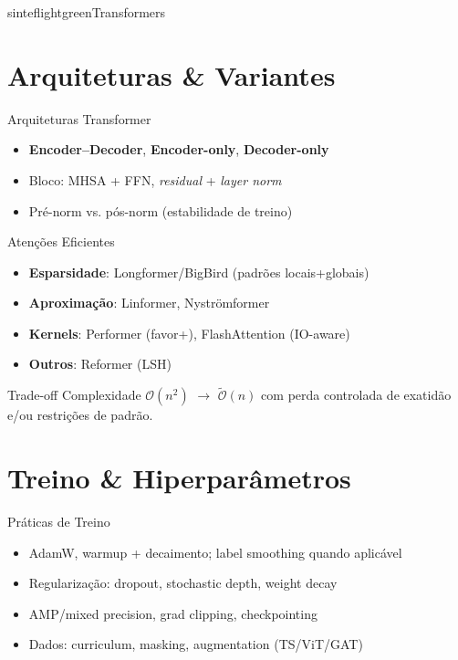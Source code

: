 \documentclass{beamer}
\begin{document}
\begin{chapter}{sinteflightgreen}{Transformers}\end{chapter}

\section{Arquiteturas \& Variantes}
\begin{frame}{Arquiteturas Transformer}
\begin{itemize}[<+->]
  \item \textbf{Encoder--Decoder}, \textbf{Encoder-only}, \textbf{Decoder-only}
  \item Bloco: MHSA + FFN, \textit{residual} + \textit{layer norm}
  \item Pré-norm vs. pós-norm (estabilidade de treino)
\end{itemize}
\end{frame}

\begin{frame}{Atenções Eficientes}
\begin{itemize}[<+->]
  \item \textbf{Esparsidade}: Longformer/BigBird (padrões locais+globais)
  \item \textbf{Aproximação}: Linformer, Nyströmformer
  \item \textbf{Kernels}: Performer (favor+), FlashAttention (IO-aware)
  \item \textbf{Outros}: Reformer (LSH)
\end{itemize}
\begin{block}{Trade-off}
Complexidade $\mathcal{O}(n^2)$ $\rightarrow$ $\tilde{\mathcal{O}}(n)$ com perda controlada de exatidão e/ou restrições de padrão.
\end{block}
\end{frame}

\section{Treino \& Hiperparâmetros}
\begin{frame}{Práticas de Treino}
\begin{itemize}[<+->]
  \item AdamW, warmup + decaimento; label smoothing quando aplicável
  \item Regularização: dropout, stochastic depth, weight decay
  \item AMP/mixed precision, grad clipping, checkpointing
  \item Dados: curriculum, masking, augmentation (TS/ViT/GAT)
\end{itemize}
\end{frame}
\end{document}
